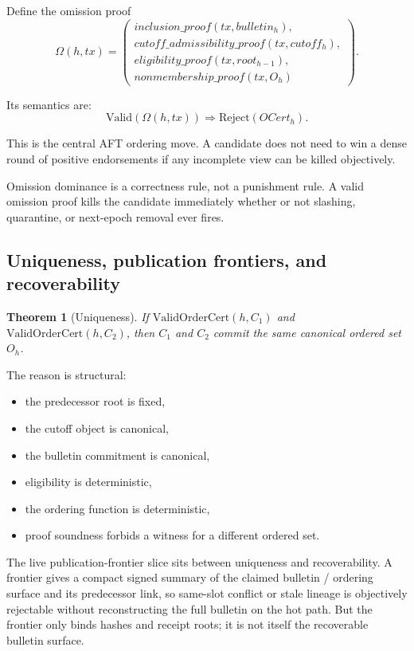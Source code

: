 \documentclass[11pt]{article}
\newtheorem{theorem}{Theorem}
\newcommand{\AFT}{\textsc{AFT}}
\begin{document}
Define the omission proof
\[
\Omega(h, tx) =
\left(
\begin{array}{l}
  inclusion\_proof(tx, bulletin_h), \\
  cutoff\_admissibility\_proof(tx, cutoff_h), \\
  eligibility\_proof(tx, root_{h-1}), \\
  nonmembership\_proof(tx, O_h)
\end{array}
\right).
\]

Its semantics are:
\[
\mathrm{Valid}(\Omega(h, tx)) \Rightarrow \mathrm{Reject}(OCert_h).
\]

This is the central \AFT{} ordering move. A candidate does not need to win a
dense round of positive endorsements if any incomplete view can be killed
objectively.

Omission dominance is a correctness rule, not a punishment rule. A valid
omission proof kills the candidate immediately whether or not slashing,
quarantine, or next-epoch removal ever fires.

\subsection{Uniqueness, publication frontiers, and recoverability}

\begin{theorem}[Uniqueness]
If \(\mathrm{ValidOrderCert}(h, C_1)\) and \(\mathrm{ValidOrderCert}(h, C_2)\),
then \(C_1\) and \(C_2\) commit the same canonical ordered set \(O_h\).
\end{theorem}

The reason is structural:

\begin{itemize}[leftmargin=1.5em]
\item the predecessor root is fixed,
\item the cutoff object is canonical,
\item the bulletin commitment is canonical,
\item eligibility is deterministic,
\item the ordering function is deterministic,
\item proof soundness forbids a witness for a different ordered set.
\end{itemize}

The live publication-frontier slice sits between uniqueness and
recoverability. A frontier gives a compact signed summary of the claimed
bulletin / ordering surface and its predecessor link, so same-slot conflict or
stale lineage is objectively rejectable without reconstructing the full
bulletin on the hot path. But the frontier only binds hashes and receipt roots;
it is not itself the recoverable bulletin surface.
\end{document}
